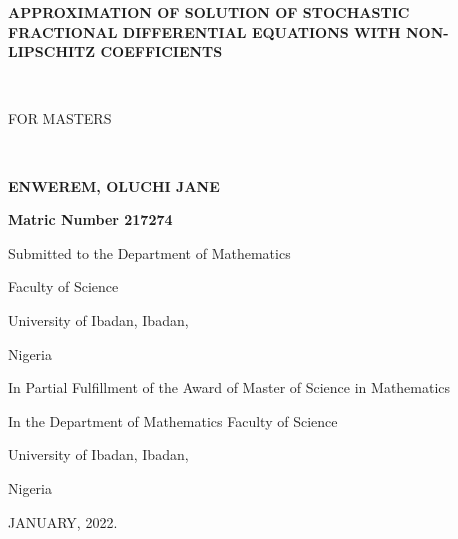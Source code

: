 \documentclass[a4 paper, 12pt]{report}
\theoremstyle{plain}
\begin{document}
	 \baselineskip 29pt
\newcommand{\disp}{\displaystyle}
\thispagestyle{empty}




\begin{center}
	\textbf{\large{APPROXIMATION OF SOLUTION OF STOCHASTIC FRACTIONAL DIFFERENTIAL EQUATIONS WITH NON-LIPSCHITZ  COEFFICIENTS}}
\end{center}
\ \
\begin{center}
	
	FOR  MASTERS
\end{center}
\ \
\begin{center}
	\textbf{\large{ENWEREM, OLUCHI JANE}}
\end{center}
\begin{center}
	\textbf{Matric Number 217274}
\end{center}
\begin{center}
	Submitted to the Department of  Mathematics
\end{center}
\begin{center}
	Faculty of Science  
\end{center}
\begin{center}
	University of Ibadan, Ibadan,  
\end{center}
\begin{center}
	Nigeria  
\end{center}
\begin{center}
	In Partial Fulfillment of the Award of Master of Science in Mathematics
\end{center}
\begin{center}
	In the Department of Mathematics Faculty of Science
\end{center}
\begin{center}
	University of Ibadan, Ibadan,  
\end{center}
\begin{center}
	Nigeria  
\end{center}

\begin{center}
JANUARY, 2022.
\end{center}
\end{document}
